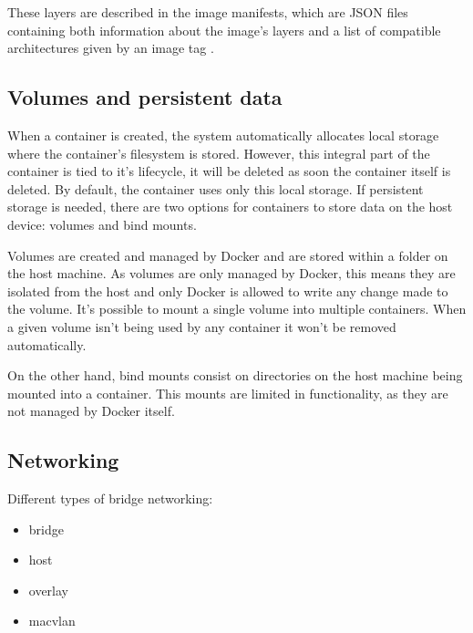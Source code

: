 These layers are described in the image manifests, which are \acs{JSON} files containing both information about the image's layers and a list of compatible architectures given by an image tag \cite{image-manifest}.


\subsection{Volumes and persistent data}
\label{sec::arch:volumes}

When a container is created, the system automatically allocates local storage where the container's filesystem is stored. However, this integral part of the container is tied to it's lifecycle, it will be deleted as soon the container itself is deleted. By default, the container uses only this local storage. If persistent storage is needed, there are two options for containers to store data on the host device: volumes and bind mounts\cite{container-storage}.

Volumes are created and managed by Docker and are stored within a folder on the host machine. As volumes are only managed by Docker, this means they are isolated from the host and only Docker is allowed to write any change made to the volume. It's possible to mount a single volume into multiple containers. When a given volume isn't being used by any container it won't be removed automatically.

On the other hand, bind mounts consist on directories on the host machine being mounted into a container. This mounts are limited in functionality, as they are not managed by Docker itself.


\subsection{Networking}
\label{sec::arch:net}

Different types of bridge networking:

\begin{itemize}
    \item bridge
    \item host
    \item overlay
    \item macvlan
\end{itemize}

